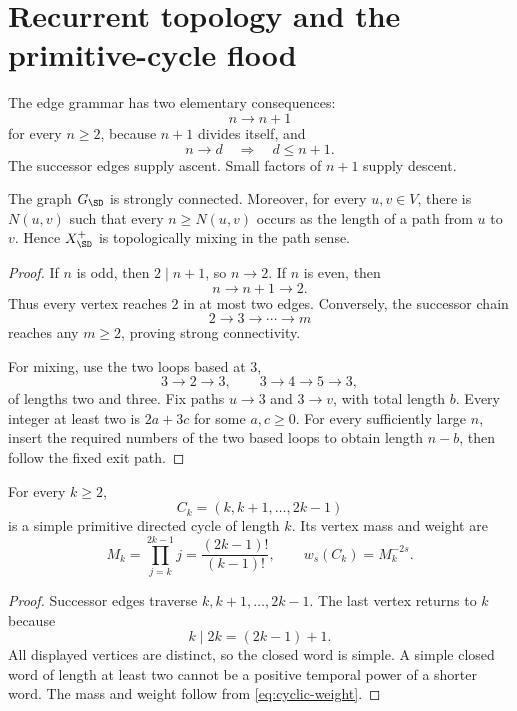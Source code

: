 \section{Recurrent topology and the primitive-cycle flood}
\label{sec:topology}

The edge grammar has two elementary consequences:
\[
 n\to n+1
\]
for every \(n\ge2\), because \(n+1\) divides itself, and
\[
 n\to d\quad\Longrightarrow\quad d\le n+1.
\]
The successor edges supply ascent.  Small factors of \(n+1\) supply descent.

\begin{theorem}
\label{thm:mixing}
The graph \(G_{\SD}\) is strongly connected.  Moreover, for every
\(u,v\in V\), there is \(N(u,v)\) such that every \(n\ge N(u,v)\) occurs as
the length of a path from \(u\) to \(v\).  Hence \(X_{\SD}^{+}\) is
topologically mixing in the path sense.
\end{theorem}

\begin{proof}
If \(n\) is odd, then \(2\mid n+1\), so \(n\to2\).  If \(n\) is even, then
\[
 n\to n+1\to2.
\]
Thus every vertex reaches \(2\) in at most two edges.  Conversely, the
successor chain
\[
 2\to3\to\cdots\to m
\]
reaches any \(m\ge2\), proving strong connectivity.

For mixing, use the two loops based at \(3\),
\[
 3\to2\to3,
 \qquad
 3\to4\to5\to3,
\]
of lengths two and three.  Fix paths \(u\to3\) and \(3\to v\), with total
length \(b\).  Every integer at least two is \(2a+3c\) for some
\(a,c\ge0\).  For every sufficiently large \(n\), insert the required
numbers of the two based loops to obtain length \(n-b\), then follow the
fixed exit path.
\end{proof}

\begin{theorem}
\label{thm:canonical}
For every \(k\ge2\),
\[
 C_k=(k,k+1,\ldots,2k-1)
\]
is a simple primitive directed cycle of length \(k\).  Its vertex mass and
weight are
\[
 M_k=\prod_{j=k}^{2k-1}j=\frac{(2k-1)!}{(k-1)!},
 \qquad
 w_s(C_k)=M_k^{-2s}.
\]
\end{theorem}

\begin{proof}
Successor edges traverse \(k,k+1,\ldots,2k-1\).  The last vertex returns to
\(k\) because
\[
 k\mid2k=(2k-1)+1.
\]
All displayed vertices are distinct, so the closed word is simple.  A simple
closed word of length at least two cannot be a positive temporal power of a
shorter word.  The mass and weight follow from
\cref{eq:cyclic-weight}.
\end{proof}

